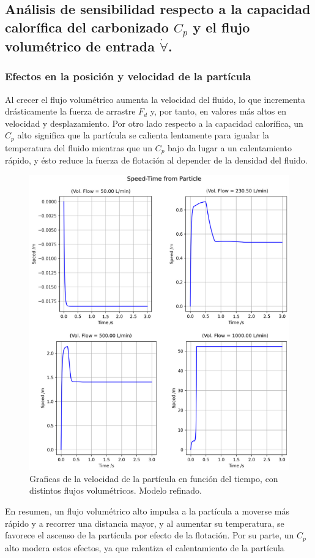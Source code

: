\documentclass[11pt,stdletter,orderfromtodate,sigleft,twoside]{report}
\begin{document}
\subsection{Análisis de sensibilidad respecto a la capacidad calorífica del carbonizado $C_p$ y el flujo
volumétrico de entrada $\dot{\forall}$.}

\subsubsection{Efectos en la posición y velocidad de la partícula}

Al crecer el flujo volumétrico aumenta la velocidad del fluido, lo que incrementa drásticamente la fuerza de arrastre $F_d$  y, por tanto, en valores más altos en velocidad y desplazamiento. Por otro lado respecto a la capacidad calorífica, un $C_p$ alto significa que la partícula se calienta lentamente para igualar la temperatura del fluido mientras que un $C_p$ bajo da lugar a un calentamiento rápido, y ésto reduce la fuerza de flotación al depender de la densidad del fluido.

\begin{figure}[H]
    \centering
    \includegraphics[width=0.6\linewidth]{figures/Radcte.png}
    \caption{Graficas de la velocidad de la partícula en función del tiempo, con distintos flujos volumétricos. Modelo refinado.}
    \label{fig:enter-label}
\end{figure}

En resumen, un flujo volumétrico alto impulsa a la partícula a moverse más rápido y a recorrer una distancia mayor, y al aumentar su temperatura, se favorece el ascenso de la partícula por efecto de la flotación. Por su parte, un $C_p$ alto modera estos efectos, ya que ralentiza el calentamiento de la partícula 
\end{document}
